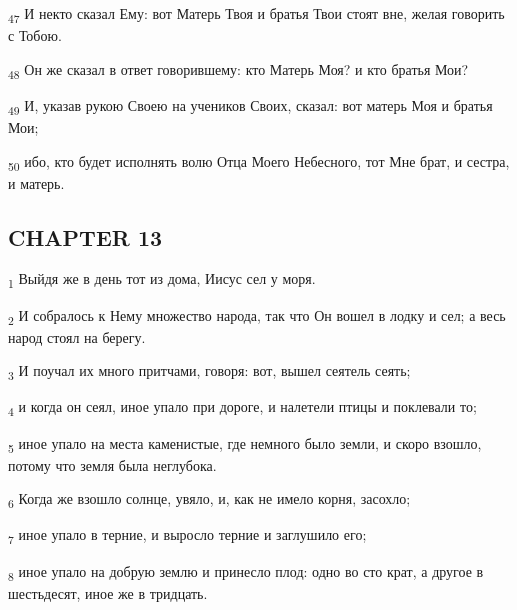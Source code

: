 \begin{tcolorbox}
\textsubscript{47} И некто сказал Ему: вот Матерь Твоя и братья Твои стоят вне, желая говорить с Тобою.
\end{tcolorbox}
\begin{tcolorbox}
\textsubscript{48} Он же сказал в ответ говорившему: кто Матерь Моя? и кто братья Мои?
\end{tcolorbox}
\begin{tcolorbox}
\textsubscript{49} И, указав рукою Своею на учеников Своих, сказал: вот матерь Моя и братья Мои;
\end{tcolorbox}
\begin{tcolorbox}
\textsubscript{50} ибо, кто будет исполнять волю Отца Моего Небесного, тот Мне брат, и сестра, и матерь.
\end{tcolorbox}
\subsection{CHAPTER 13}
\begin{tcolorbox}
\textsubscript{1} Выйдя же в день тот из дома, Иисус сел у моря.
\end{tcolorbox}
\begin{tcolorbox}
\textsubscript{2} И собралось к Нему множество народа, так что Он вошел в лодку и сел; а весь народ стоял на берегу.
\end{tcolorbox}
\begin{tcolorbox}
\textsubscript{3} И поучал их много притчами, говоря: вот, вышел сеятель сеять;
\end{tcolorbox}
\begin{tcolorbox}
\textsubscript{4} и когда он сеял, иное упало при дороге, и налетели птицы и поклевали то;
\end{tcolorbox}
\begin{tcolorbox}
\textsubscript{5} иное упало на места каменистые, где немного было земли, и скоро взошло, потому что земля была неглубока.
\end{tcolorbox}
\begin{tcolorbox}
\textsubscript{6} Когда же взошло солнце, увяло, и, как не имело корня, засохло;
\end{tcolorbox}
\begin{tcolorbox}
\textsubscript{7} иное упало в терние, и выросло терние и заглушило его;
\end{tcolorbox}
\begin{tcolorbox}
\textsubscript{8} иное упало на добрую землю и принесло плод: одно во сто крат, а другое в шестьдесят, иное же в тридцать.
\end{tcolorbox}
